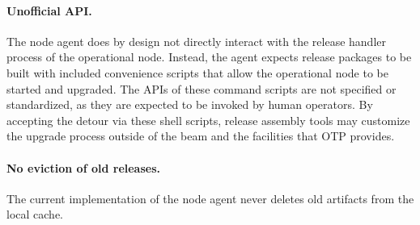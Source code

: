 \paragraph{Unofficial API.} The node agent does by design not directly interact with the release handler process of the operational node. Instead, the agent expects release packages to be built with included convenience scripts that allow the operational node to be started and upgraded. The APIs of these command scripts are not specified or standardized, as they are expected to be invoked by human operators. By accepting the detour via these shell scripts, release assembly tools may customize the upgrade process outside of the \acrshort{beam} and the facilities that OTP provides.

\paragraph{No eviction of old releases.} The current implementation of the node agent never deletes old artifacts from the local cache.
